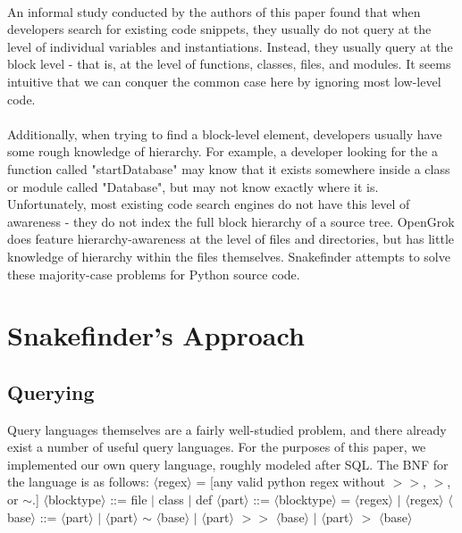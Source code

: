 \documentclass{article}
\begin{document}
\paragraph{}
An informal study conducted by the authors of this paper found that when developers search for existing code snippets, they usually do not query at the level of individual variables and instantiations. Instead, they usually query at the block level - that is, at the level of functions, classes, files, and modules. It seems intuitive that we can conquer the common case here by ignoring most low-level code.

\paragraph{}
Additionally, when trying to find a block-level element, developers usually have some rough knowledge of hierarchy. For example, a developer looking for the a function called "startDatabase" may know that it exists somewhere inside a class or module called "Database", but may not know exactly where it is. Unfortunately, most existing code search engines do not have this level of awareness - they do not index the full block hierarchy of a source tree. OpenGrok does feature hierarchy-awareness at the level of files and directories, but has little knowledge of hierarchy within the files themselves. Snakefinder attempts to solve these majority-case problems for Python source code.

\section{Snakefinder's Approach}
\subsection{Querying}
Query languages themselves are a fairly well-studied problem, and there already exist a number of useful query languages. For the purposes of this paper, we implemented our own query language, roughly modeled after SQL. The BNF for the language is as follows:\newline
\newline
$\langle$regex$\rangle$ = [any valid python regex without $>>$, $>$, or $\sim$.]
\newline
$\langle$blocktype$\rangle$ ::= file $|$ class $|$ def
\newline
$\langle$part$\rangle$ ::= $\langle$blocktype$\rangle$ = $\langle$regex$\rangle$ $|$ $\langle$regex$\rangle$
\newline
$\langle$base$\rangle$ ::= $\langle$part$\rangle$ $|$ $\langle$part$\rangle$ $\sim$ $\langle$base$\rangle$ $|$ $\langle$part$\rangle$ $>>$ $\langle$base$\rangle$ $|$ $\langle$part$\rangle$ $>$ $\langle$base$\rangle$
\newline
\end{document}
